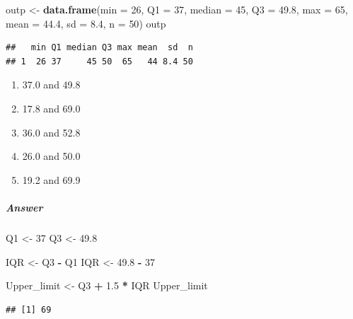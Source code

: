 \documentclass[]{article}
\newenvironment{Shaded}{\begin{snugshade}}{\end{snugshade}}
\newcommand{\KeywordTok}[1]{\textcolor[rgb]{0.13,0.29,0.53}{\textbf{#1}}}
\newcommand{\DataTypeTok}[1]{\textcolor[rgb]{0.13,0.29,0.53}{#1}}
\newcommand{\DecValTok}[1]{\textcolor[rgb]{0.00,0.00,0.81}{#1}}
\newcommand{\FloatTok}[1]{\textcolor[rgb]{0.00,0.00,0.81}{#1}}
\newcommand{\StringTok}[1]{\textcolor[rgb]{0.31,0.60,0.02}{#1}}
\newcommand{\OperatorTok}[1]{\textcolor[rgb]{0.81,0.36,0.00}{\textbf{#1}}}
\newcommand{\NormalTok}[1]{#1}
\providecommand{\tightlist}{%
  \setlength{\itemsep}{0pt}\setlength{\parskip}{0pt}}
\let\oldsubparagraph\subparagraph
\renewcommand{\subparagraph}[1]{\oldsubparagraph{#1}\mbox{}}
\begin{document}
\begin{Shaded}
\begin{Highlighting}[]
\NormalTok{outp <-}\StringTok{ }\KeywordTok{data.frame}\NormalTok{(}\DataTypeTok{min =} \DecValTok{26}\NormalTok{, }\DataTypeTok{Q1 =} \DecValTok{37}\NormalTok{, }\DataTypeTok{median =} \DecValTok{45}\NormalTok{, }\DataTypeTok{Q3 =} \FloatTok{49.8}\NormalTok{, }\DataTypeTok{max =} \DecValTok{65}\NormalTok{, }\DataTypeTok{mean =} \FloatTok{44.4}\NormalTok{, }\DataTypeTok{sd =} \FloatTok{8.4}\NormalTok{, }\DataTypeTok{n =} \DecValTok{50}\NormalTok{)}
\NormalTok{outp}
\end{Highlighting}
\end{Shaded}

\begin{verbatim}
##   min Q1 median Q3 max mean  sd  n
## 1  26 37     45 50  65   44 8.4 50
\end{verbatim}

\begin{enumerate}
\def\labelenumi{\alph{enumi}.}
\tightlist
\item
  37.0 and 49.8
\item
  17.8 and 69.0
\item
  36.0 and 52.8
\item
  26.0 and 50.0
\item
  19.2 and 69.9
\end{enumerate}

\subparagraph{Answer}\label{answer-2}

\begin{Shaded}
\begin{Highlighting}[]
\NormalTok{Q1 <-}\StringTok{ }\DecValTok{37}
\NormalTok{Q3 <-}\StringTok{ }\FloatTok{49.8}

\NormalTok{IQR <-}\StringTok{ }\NormalTok{Q3 }\OperatorTok{-}\StringTok{ }\NormalTok{Q1}
\NormalTok{IQR <-}\StringTok{ }\FloatTok{49.8} \OperatorTok{-}\StringTok{ }\DecValTok{37}
\end{Highlighting}
\end{Shaded}

\begin{Shaded}
\begin{Highlighting}[]
\NormalTok{Upper_limit <-}\StringTok{ }\NormalTok{Q3 }\OperatorTok{+}\StringTok{ }\FloatTok{1.5} \OperatorTok{*}\StringTok{ }\NormalTok{IQR}
\NormalTok{Upper_limit}
\end{Highlighting}
\end{Shaded}

\begin{verbatim}
## [1] 69
\end{verbatim}
\end{document}
